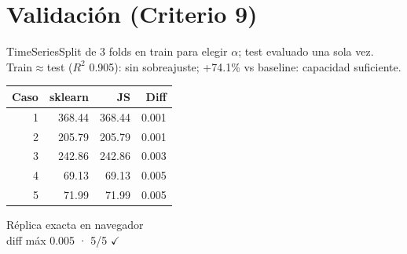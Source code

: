 \documentclass[11pt]{article}
\begin{document}
\section{Validación (Criterio 9)}
TimeSeriesSplit de 3 folds en train para elegir $\alpha$; test evaluado una sola vez.
Train$\approx$test ($R^2$ 0.905): sin sobreajuste; +74.1\% vs baseline: capacidad suficiente.
\begin{center}
\begin{minipage}{0.46\linewidth}
{\small
\begin{tabular}{rrrr}
\toprule Caso & sklearn & JS & Diff \\
\midrule 1 & 368.44 & 368.44 & 0.001 \\
2 & 205.79 & 205.79 & 0.001 \\
3 & 242.86 & 242.86 & 0.003 \\
4 & 69.13 & 69.13 & 0.005 \\
5 & 71.99 & 71.99 & 0.005 \\
\bottomrule
\end{tabular}}
\end{minipage}\hfill
\begin{minipage}{0.50\linewidth}
\begin{kpi}Réplica exacta en navegador\\{\small diff máx 0.005 · 5/5 $\checkmark$}\end{kpi}
\end{minipage}
\end{center}
\end{document}
